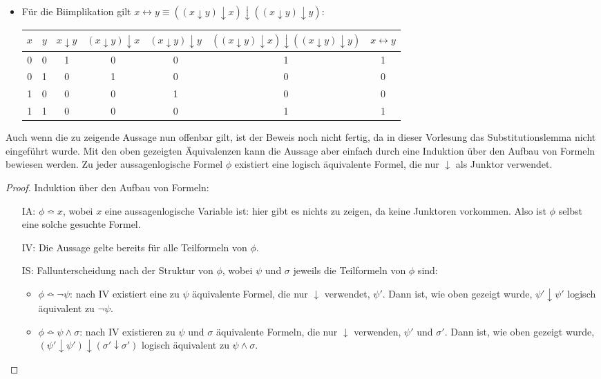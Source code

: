 \documentclass[a4paper,10pt]{article}
\begin{document}
\begin{enumerate}
\begin{itemize}
\item Für die Biimplikation gilt $x \leftrightarrow y \equiv ((x \downarrow y) \downarrow x) \downarrow ((x \downarrow y) \downarrow y)$: \\
\begin{tabular}{|c|c|c|c|c|c|c|}
\hline 
\rule[-1ex]{0pt}{2.5ex} $x$ & $y$ & $x \downarrow y$ & $(x \downarrow y) \downarrow x$ & $(x \downarrow y) \downarrow y$ & $((x \downarrow y) \downarrow x) \downarrow ((x \downarrow y) \downarrow y)$ & $x \leftrightarrow y$ \\ 
\hline 
\rule[-1ex]{0pt}{2.5ex} 0 & 0 & 1 & 0 & 0 & 1 & 1 \\ 
\hline 
\rule[-1ex]{0pt}{2.5ex} 0 & 1 & 0 & 1 & 0 & 0 & 0\\ 
\hline 
\rule[-1ex]{0pt}{2.5ex} 1 & 0 & 0 & 0 & 1 & 0 & 0\\ 
\hline 
\rule[-1ex]{0pt}{2.5ex} 1 & 1 & 0 & 0 & 0 & 1 & 1\\ 
\hline
\end{tabular}
\end{itemize}
Auch wenn die zu zeigende Aussage nun offenbar gilt, ist der Beweis noch nicht fertig, da in dieser Vorlesung das Substitutionslemma nicht eingeführt wurde. Mit den oben gezeigten Äquivalenzen kann die Aussage aber einfach durch eine Induktion über den Aufbau von Formeln bewiesen werden. Zu jeder aussagenlogische Formel $\phi$ existiert eine logisch äquivalente Formel, die nur $\downarrow$ als Junktor verwendet. 
\begin{proof} Induktion über den Aufbau von Formeln: 
\begin{itemize}
\item[IA:] $\phi \bumpeq x$, wobei $x$ eine aussagenlogische Variable ist: hier gibt es nichts zu zeigen, da keine Junktoren vorkommen. Also ist $\phi$ selbst eine solche gesuchte Formel.
\item[IV:] Die Aussage gelte bereits für alle Teilformeln von $\phi$. 
\item[IS:] Fallunterscheidung nach der Struktur von $\phi$, wobei $\psi$ und $\sigma$ jeweils die Teilformeln von $\phi$ sind:
\begin{itemize}
\item $\phi \bumpeq \neg \psi$: nach IV existiert eine zu $\psi$ äquivalente Formel, die nur $\downarrow$ verwendet, $\psi'$. Dann ist, wie oben gezeigt wurde, $\psi' \downarrow \psi'$ logisch äquivalent zu $\neg \psi$.
\item $\phi \bumpeq \psi \wedge \sigma$: nach IV existieren zu $\psi$ und $\sigma$ äquivalente Formeln, die nur $\downarrow$ verwenden, $\psi'$ und $\sigma'$. Dann ist, wie oben gezeigt wurde, $(\psi' \downarrow \psi') \downarrow (\sigma' \downarrow \sigma')$ logisch äquivalent zu $\psi \wedge \sigma$.

\end{itemize}
\end{itemize}
\end{proof}
\end{enumerate}
\end{document}
